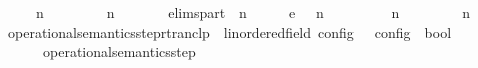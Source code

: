 \begin{isabellebody}
\ \ \ {\isasymLongrightarrow}\ {\isacharparenleft}{\isasymGamma}\ n\ {\isasymturnstile}\ {\isasymPsi}\ {\isasymtriangleright}\ {\isasymPhi}\ \ {\isasymhookrightarrow}\ \ {\isacharparenleft}{\isasymGamma}\ n\ {\isasymturnstile}\ {\isasymPsi}\ {\isasymtriangleright}\ {\isasymPhi}\isanewline
\ \ {\isacharbar}\ elims{\isacharunderscore}part{\isacharcolon}\ {\isachardoublequoteopen}{\isacharparenleft}{\isasymGamma}\ n\ {\isasymturnstile}\ {\isasymPsi}\ {\isasymtriangleright}\ {\isasymPhi}\ \ {\isasymhookrightarrow}\isactrlsub e\ \ {\isacharparenleft}{\isasymGamma}\ n\ {\isasymturnstile}\ {\isasymPsi}\ {\isasymtriangleright}\ {\isasymPhi}\isanewline
\ \ \ {\isasymLongrightarrow}\ {\isacharparenleft}{\isasymGamma}\ n\ {\isasymturnstile}\ {\isasymPsi}\ {\isasymtriangleright}\ {\isasymPhi}\ \ {\isasymhookrightarrow}\ \ {\isacharparenleft}{\isasymGamma}\ n\ {\isasymturnstile}\ {\isasymPsi}\ {\isasymtriangleright}\ {\isasymPhi}\isanewline
\isanewline
{}\isamarkupfalse%
\ operational{\isacharunderscore}semantics{\isacharunderscore}step{\isacharunderscore}rtranclp\ {\isacharcolon}{\isacharcolon}\ {\isachardoublequoteopen}{\isacharparenleft}{\isacharprime}{\isasymtau}{\isacharcolon}{\isacharcolon}linordered{\isacharunderscore}field{\isacharparenright}\ config\ {\isasymRightarrow}\ {\isacharprime}{\isasymtau}\ config\ {\isasymRightarrow}\ bool{\isachardoublequoteclose}\ {\isacharparenleft}{\isachardoublequoteopen}{\isacharunderscore}\ {\isasymhookrightarrow}\isactrlsup {\isacharasterisk}\isactrlsup {\isacharasterisk}\ {\isacharunderscore}{\isachardoublequoteclose}\ {}{}{\isacharparenright}\ \isanewline
\ \ {\isachardoublequoteopen}{\isasymC}\ {\isasymhookrightarrow}\isactrlsup {\isacharasterisk}\isactrlsup {\isacharasterisk}\ {\isasymC}\ {\isasymequiv}\ operational{\isacharunderscore}semantics{\isacharunderscore}step\isactrlsup {\isacharasterisk}\isactrlsup {\isacharasterisk}\ {\isasymC}\ {\isasymC}\isanewline

\end{isabellebody}
